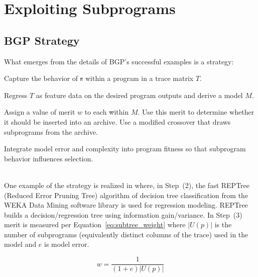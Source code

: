 \section{Exploiting Subprograms}\label{sect:foreground}
\subsection{BGP Strategy}
What emerges from the details of BGP's successful examples is a strategy:  
\begin{inparaenum}

\item Capture the behavior of \st{s} within a program in a trace matrix $T$.

\item  Regress $T$ as feature data on the desired program outputs and derive a model $M$. 

\item Assign a value of merit $w$ to each \st within $M$. Use this merit to determine whether it should be inserted into an archive. Use a modified crossover that draws subprograms from the archive. 

\item Integrate model error and complexity into program fitness so that subprogram behavior influences selection.
\end{inparaenum} \\


One example of the strategy is realized in \cite{KrawiecGECCO2014} where, in Step~(2), the fast REPTree (Reduced  Error  Pruning  Tree) algorithm  of decision tree classification from the WEKA Data Mining software library\cite{Hall:2009:WDM:1656274.1656278} is used for regression modeling.  REPTree builds a decision/regression tree using information gain/variance. In Step~(3) merit is measured per Equation~\ref{eq:subtree_weight} where $|U(p)|$ is the number of subprograms (equivalently distinct columns of the trace) used in the model and $e$ is model error.


\begin{equation}
\label{eq:subtree_weight}
w = \frac{1}{(1 + e)|U(p)|}
\end{equation}

